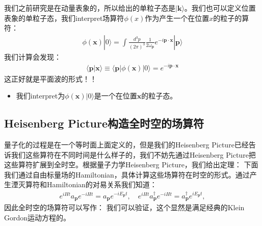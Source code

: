 我们之前研究是在动量表象的，所以给出的单粒子态是$ |\mathbf{k}\rangle
$。我们也可以定义位置表象的单粒子态，我们interpret场算符$ \phi(x) $作为产生一个在位置$ x $的粒子的算符：
\begin{align}
  \phi(\mathbf{x})|0\rangle=\int\frac{d^3p}{(2\pi)^3}\frac{1}{2\omega_\mathbf{p}}e^{-i\mathbf{p}\cdot\mathbf{x}}|\mathbf{p}\rangle
\end{align}
我们计算会发现：
\begin{align}
  \langle\mathbf{p}|\mathbf{x}\rangle\equiv\langle\mathbf{p}|\phi(\mathbf{x})|0\rangle
  = e^{-i\mathbf{p}\cdot\mathbf{x}}
\end{align}
这正好就是平面波的形式！！
\begin{itemize}
  \item 我们interpret为$ \phi(\mathbf{x})|0\rangle $是一个在位置$ \mathbf{x} $的粒子态。
\end{itemize}

\subsection{Heisenberg Picture构造全时空的场算符}\label{sec:Heisenberg Picture构造全时空的场算符}


量子化的过程是在一个等时面上面定义的，但是我们的Heisenberg
Picture已经告诉我们这些算符在不同时间是什么样子的，我们不妨先通过Heisenberg
Picture把这些算符扩展到全时空。根据量子力学Heisenberg Picture，我们给出定理：
下面我们通过自由标量场的Hamiltonian，具体计算这些场算符在时空的形式。通过产生湮灭算符和Hamiltonian的对易关系我们知道：
\begin{align}
  e^{iHt}a_\mathbf{p}e^{-iHt}=a_\mathbf{p}e^{-iE_\mathbf{p}t},\quad
  e^{iHt}a_\mathbf{p}^\dagger e^{-iHt}=a_\mathbf{p}^\dagger e^{iE_\mathbf{p}t},
\end{align}
因此全时空的场算符可以写作：
我们可以验证，这个显然是满足经典的Klein Gordon运动方程的。

